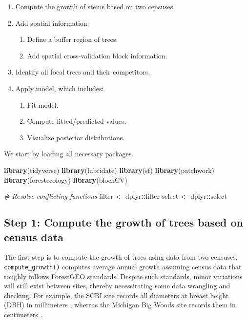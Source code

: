 \documentclass[12pt]{article}
\providecommand{\tightlist}{%
  \setlength{\itemsep}{0pt}\setlength{\parskip}{0pt}}
\newenvironment{Shaded}{\begin{snugshade}}{\end{snugshade}}
\newcommand{\CommentTok}[1]{\textcolor[rgb]{0.56,0.35,0.01}{\textit{#1}}}
\newcommand{\KeywordTok}[1]{\textcolor[rgb]{0.13,0.29,0.53}{\textbf{#1}}}
\newcommand{\NormalTok}[1]{#1}
\newcommand{\OperatorTok}[1]{\textcolor[rgb]{0.81,0.36,0.00}{\textbf{#1}}}
\newcommand{\StringTok}[1]{\textcolor[rgb]{0.31,0.60,0.02}{#1}}
\begin{document}
\begin{enumerate}
\def\labelenumi{\arabic{enumi}.}
\tightlist
\item
  Compute the growth of stems based on two censuses.
\item
  Add spatial information:

  \begin{enumerate}
  \def\labelenumii{\arabic{enumii}.}
  \tightlist
  \item
    Define a buffer region of trees.
  \item
    Add spatial cross-validation block information.
  \end{enumerate}
\item
  Identify all focal trees and their competitors.
\item
  Apply model, which includes:

  \begin{enumerate}
  \def\labelenumii{\arabic{enumii}.}
  \tightlist
  \item
    Fit model.
  \item
    Compute fitted/predicted values.
  \item
    Visualize posterior distributions.
  \end{enumerate}
\end{enumerate}

We start by loading all necessary packages.

\begin{Shaded}
\begin{Highlighting}[]
\KeywordTok{library}\NormalTok{(tidyverse)}
\KeywordTok{library}\NormalTok{(lubridate)}
\KeywordTok{library}\NormalTok{(sf)}
\KeywordTok{library}\NormalTok{(patchwork)}
\KeywordTok{library}\NormalTok{(forestecology)}
\KeywordTok{library}\NormalTok{(blockCV)}

\CommentTok{# Resolve conflicting functions}
\NormalTok{filter <-}\StringTok{ }\NormalTok{dplyr}\OperatorTok{::}\NormalTok{filter}
\NormalTok{select <-}\StringTok{ }\NormalTok{dplyr}\OperatorTok{::}\NormalTok{select}
\end{Highlighting}
\end{Shaded}

\hypertarget{compute-growth}{%
\subsection{Step 1: Compute the growth of trees based on census
data}\label{compute-growth}}

The first step is to compute the growth of trees using data from two
censuses. \texttt{compute\_growth()} computes average annual growth
assuming census data that roughly follows ForestGEO standards. Despite
such standards, minor variations will still exist between sites, thereby
necessitating some data wrangling and checking. For example, the SCBI
site records all diameters at breast height (DBH) in millimeters
\citep{bourg_initial_2013}, whereas the Michigan Big Woods site records
them in centimeters \citep{allen_michigan_2020}.
\end{document}
